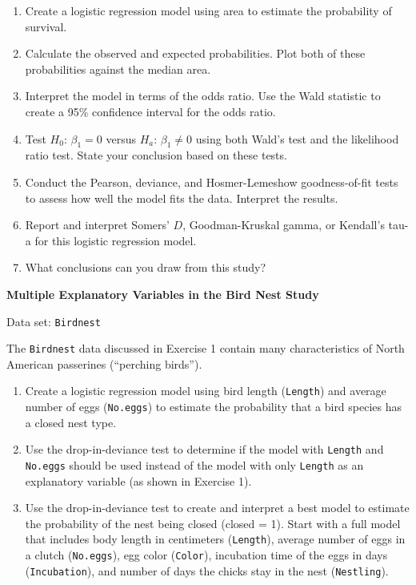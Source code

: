 \documentclass[
]{report}
\begin{document}
\begin{list}{E..}{ \setlength{\itemsep}{1.2em}}
  \begin{enumerate}
    \item Create a logistic regression model using area to estimate the probability of survival.
    \item Calculate the observed and expected probabilities. Plot both of these probabilities against the median area.
    \item Interpret the model in terms of the odds ratio. Use the Wald statistic to create a 95\% confidence interval for the odds ratio.
    \item Test $H_0$: $\beta_1 = 0$ versus $H_a$: $\beta_1 \ne 0$ using both Wald’s test and the likelihood ratio test. State your conclusion based on these tests.
    \item Conduct the Pearson, deviance, and Hosmer-Lemeshow goodness-of-fit tests to assess how well the model fits the data. Interpret the results.
    \item Report and interpret Somers’ $D$, Goodman-Kruskal gamma, or Kendall’s tau-a for this logistic regression model.
    \item What conclusions can you draw from this study?
  \end{enumerate}

  \item \textbf{Multiple Explanatory Variables in the Bird Nest Study}

Data set: \texttt{Birdnest}

The \texttt{Birdnest} data discussed in Exercise 1 contain many characteristics of North American passerines (“perching birds”).

  \begin{enumerate}
    \item Create a logistic regression model using bird length (\texttt{Length}) and average number of eggs (\texttt{No.eggs}) to estimate the probability that a bird species has a closed nest type.
    \item Use the drop-in-deviance test to determine if the model with \texttt{Length} and \texttt{No.eggs} should be used instead of the model with only \texttt{Length} as an explanatory variable (as shown in Exercise 1).
    \item Use the drop-in-deviance test to create and interpret a best model to estimate the probability of the nest being closed (closed = 1). Start with a full model that includes body length in centimeters (\texttt{Length}), average number of eggs in a clutch (\texttt{No.eggs}), egg color (\texttt{Color}), incubation time of the eggs in days (\texttt{Incubation}), and number of days the chicks stay in the nest (\texttt{Nestling}).
  \end{enumerate}


\end{list}
\end{document}
